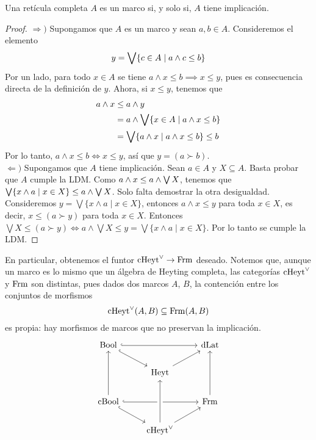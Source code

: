 \begin{thm}
  Una retícula completa $A$ es un marco si, y solo si, $A$ tiene
  implicación.
\end{thm}
\begin{proof}
    $\Rightarrow )$ Supongamos que $A$ es un marco y sean $a,b\in A$.
    Consideremos el elemento
    $$y=\bigvee\{c\in A\mid a\wedge c\leq b\}$$
    Por un lado, para todo $x\in A$ se tiene
    $a\wedge x\leq b\implies x\leq y$,
    pues es consecuencia directa de la definición de $y$.
    Ahora, si $x\leq y$, tenemos que 
    \begin{align*}
        a\wedge x
        & \leq a\wedge y \\
        & = a\wedge\bigvee\{x\in A\mid a\wedge x\leq b\}\\
        & = \bigvee \{a\wedge x \mid a\wedge x\leq b\}\leq b
    \end{align*}
    Por lo tanto, $a\wedge x\leq b\Leftrightarrow x\leq y$,
    así que $y=(a\succ b)$. \\
    $\Leftarrow )$ Supongamos que $A$ tiene implicación.
    Sean $a\in A$ y $X\subseteq A$.
    Basta probar que $A$ cumple la LDM.
    Como $a\wedge x\leq a\wedge\bigvee X$, tenemos que
    $\bigvee\{x\wedge a\mid x\in X\}\leq a\wedge\bigvee X$.
    Solo falta demostrar la otra desigualdad. Consideremos $y=\bigvee\{x\wedge a\mid x\in X\}$, entonces $a\wedge x\leq y$ para toda $x\in X$, es decir, $x\leq (a\succ y)$ para toda $x\in X$. Entonces $\bigvee X\leq (a\succ y)\Leftrightarrow a\wedge\bigvee X\leq y=\bigvee \{x\wedge a\mid x\in X\}$. Por lo tanto se cumple la LDM.
\end{proof}

En particular, obtenemos el funtor $\mathrm{cHeyt}^\vee\to\mathrm{Frm}$ deseado.
Notemos que, aunque un marco es lo mismo que un álgebra de Heyting
completa, las categorías $\mathrm{cHeyt}^\vee$ y $\mathrm{Frm}$ son distintas, pues dados
dos marcos $A$, $B$, la contención entre los conjuntos de morfismos
\begin{equation}
  \mathrm{cHeyt}^\vee(A,B) \subseteq \mathrm{Frm}(A,B)
\end{equation}
es propia: hay morfismos de marcos que no preservan la implicación.
\begin{equation}\label{diag:prisma-cheyt-completo}
\begin{tikzcd}
  \Bool \ar[dr,hook] \ar[rr,hook] &               & \DLat \\
                                  & \Heyt \ar[ur]         \\
  \CBA \ar[uu] \ar[rr,hook] \ar[dr,hook] & & \Frm \ar[uu]    \\
                            & \cHeyt \ar[uu,crossing over] \ar[ur]
\end{tikzcd}
\end{equation}

